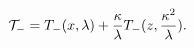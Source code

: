 \begin{equation}
	{\cal T_{-}}=T_{-}(x,\lambda)+
	\frac{\kappa}{\lambda}T_{-}(z,\frac{\kappa^{2}}{\lambda}) .
\end{equation}

